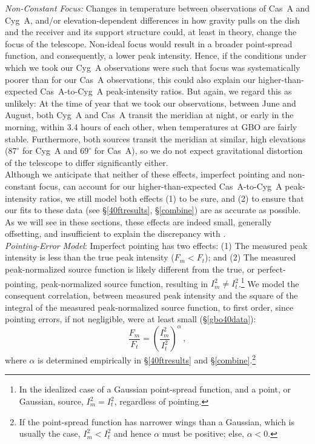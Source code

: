 \documentclass[fleqn,usenatbib]{mnras}
\begin{document}
\noindent
\textit{Non-Constant Focus:}  Changes in temperature between observations of Cas~A and Cyg~A, and/or elevation-dependent differences in how gravity pulls on the dish and the receiver and its support structure could, at least in theory, change the focus of the telescope.  Non-ideal focus would result in a broader point-spread function, and consequently, a lower peak intensity.  Hence, if the conditions under which we took our Cyg~A observations were such that focus was systematically poorer than for our Cas~A observations, this could also explain our higher-than-expected Cas~A-to-Cyg~A peak-intensity ratios.  But again, we regard this as unlikely:  At the time of year that we took our observations, between June and August, both Cyg~A and Cas~A transit the meridian at night, or early in the morning, within 3.4 hours of each other, when temperatures at GBO are fairly stable.  Furthermore, both sources transit the meridian at similar, high elevations ($87^\circ$ for Cyg~A and $69^\circ$ for Cas~A), so we do not expect gravitational distortion of the telescope to differ significantly either.
\\



\indent
Although we anticipate that neither of these effects, imperfect pointing and non-constant focus, can account for our higher-than-expected Cas~A-to-Cyg~A peak-intensity ratios, we still model both effects (1) to be sure, and (2) to ensure that our fits to these data (see \S\ref{40ftresults}, \S\ref{combine}) are as accurate as possible.  As we will see in these sections, these effects are indeed small, generally offsetting, and insufficient to explain the discrepancy with \citet{b77}.
\\

\noindent
\textit{Pointing-Error Model}:  Imperfect pointing has two effects:  (1) The measured peak intensity is less than the true peak intensity ($F_m < F_t$); and (2) The measured peak-normalized source function is likely different from the true, or perfect-pointing, peak-normalized source function, resulting in $I_m^2 \neq I_t^2$.\footnote{In the idealized case of a Gaussian point-spread function, and a point, or Gaussian, source, $I_m^2 = I_t^2$, regardless of pointing.}  We model the consequent correlation, between measured peak intensity and the square of the integral of the measured peak-normalized source function, to first order, since pointing errors, if not negligible, were at least small (\S\ref{gbo40data}):
\begin{equation}\label{eq_fmft}
\frac{F_m}{F_t} = \left({\frac{I^2_m}{I^2_t}}\right)^\alpha \, ,
\end{equation}
\noindent where $\alpha$ is determined empirically in \S\ref{40ftresults} and \S\ref{combine}.\footnote{If the point-spread function has narrower wings than a Gaussian, which is usually the case, $I_m^2 < I_t^2$ and hence $\alpha$ must be positive; else, $\alpha < 0$.}     
\\
\end{document}
